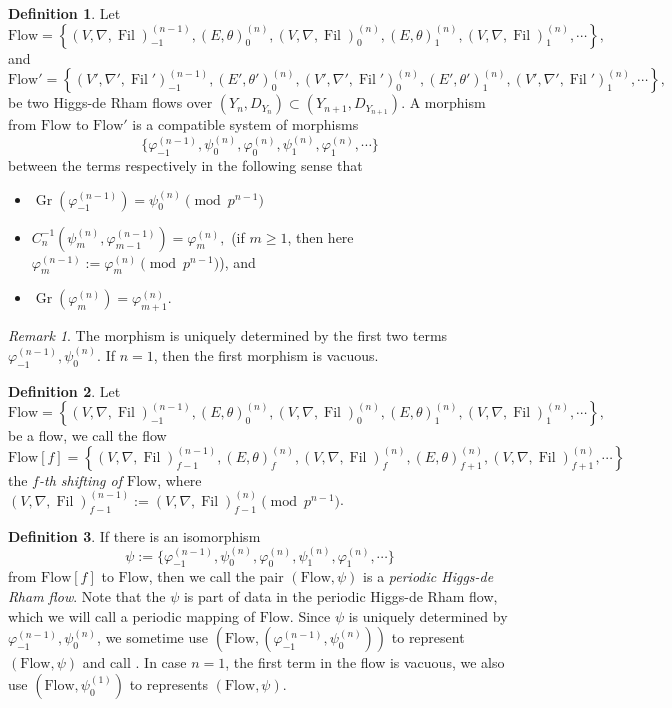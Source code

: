 \documentclass[12pt,twoside]{book}
\theoremstyle{plain}
\theoremstyle{definition}
\newtheorem{definition}[definition]{Definition}
\theoremstyle{remark}
\newtheorem{remark}[remark]{Remark}
\DeclareMathOperator\Fil{Fil}
\DeclareMathOperator\Gr{Gr}
\numberwithin{equation}{section}
\def\Flow{\mathrm{Flow}}
\begin{document}
\begin{definition}
Let \[\Flow = \left\{
(V,\nabla,\Fil)^{(n-1)}_{-1},
(E,\theta)_{0}^{(n)},
(V,\nabla,\Fil)_{0}^{(n)},
(E,\theta)_{1}^{(n)},
(V,\nabla,\Fil)_{1}^{(n)},
\cdots\right\},\]
and
\[\Flow'=\left\{
(V',\nabla',\Fil')^{(n-1)}_{-1},
(E',\theta')_{0}^{(n)},
(V',\nabla',\Fil')_{0}^{(n)},
(E',\theta')_{1}^{(n)},
(V',\nabla',\Fil')_{1}^{(n)},
\cdots\right\},\]
be two Higgs-de Rham flows over $(Y_n,D_{Y_n})\subset (Y_{n+1},D_{Y_{n+1}})$. A morphism from $\Flow$ to $\Flow'$ is a compatible system of morphisms
\[\{\varphi_{-1}^{(n-1)},\psi_{0}^{(n)},\varphi_{0}^{(n)},\psi_{1}^{(n)},\varphi_{1}^{(n)},\cdots\}\]
between the terms respectively in the following sense that
\begin{itemize}
\item $\Gr(\varphi_{-1}^{(n-1)})=\psi_{0}^{(n)}\pmod{p^{n-1}}$
\item $C_n^{-1}(\psi_m^{(n)},\varphi_{m-1}^{(n-1)}) = \varphi_m^{(n)},$ (if $m\geq1$, then here $\varphi_m^{(n-1)}:=\varphi_m^{(n)}\pmod{p^{n-1}}$), and
\item $\Gr(\varphi_m^{(n)})=\varphi_{m+1}^{(n)}$.
\end{itemize}
\end{definition}

\begin{remark}
The morphism is uniquely determined by the first two terms $\varphi_{-1}^{(n-1)},\psi_{0}^{(n)}$. If $n=1$, then the first morphism is vacuous.
\end{remark}

\begin{definition}
Let
\[\Flow = \left\{
(V,\nabla,\Fil)^{(n-1)}_{-1},
(E,\theta)_{0}^{(n)},
(V,\nabla,\Fil)_{0}^{(n)},
(E,\theta)_{1}^{(n)},
(V,\nabla,\Fil)_{1}^{(n)},
\cdots\right\},\]
be a flow, we call the flow
\[\Flow[f] = \left\{
(V,\nabla,\Fil)^{(n-1)}_{f-1},
(E,\theta)_{f}^{(n)},
(V,\nabla,\Fil)_{f}^{(n)},
(E,\theta)_{f+1}^{(n)},
(V,\nabla,\Fil)_{f+1}^{(n)},
\cdots\right\}\]
the \emph{$f$-th shifting of $\Flow$}, where $(V,\nabla,\Fil)^{(n-1)}_{f-1}:=(V,\nabla,\Fil)^{(n)}_{f-1}\pmod{p^{n-1}}$.
\end{definition}

\begin{definition}
If there is an isomorphism
\[\psi:=\{\varphi_{-1}^{(n-1)},\psi_{0}^{(n)},\varphi_{0}^{(n)},\psi_{1}^{(n)},\varphi_{1}^{(n)},\cdots\}\]
from $\Flow[f]$ to $\Flow$, then we call the pair $(\Flow,\psi)$ is a \emph{periodic Higgs-de Rham flow}. Note that the $\psi$ is part of data in the periodic Higgs-de Rham flow, which we will call a periodic mapping of $\Flow$.
Since $\psi$ is uniquely determined by $\varphi_{-1}^{(n-1)},\psi_{0}^{(n)}$, we sometime use $(\Flow,(\varphi_{-1}^{(n-1)},\psi_{0}^{(n)}))$ to represent $(\Flow,\psi)$ and call . In case $n=1$, the first term in the flow is vacuous, we also use $(\Flow,\psi_{0}^{(1)})$ to represents $(\Flow,\psi)$.
\end{definition}
\end{document}
